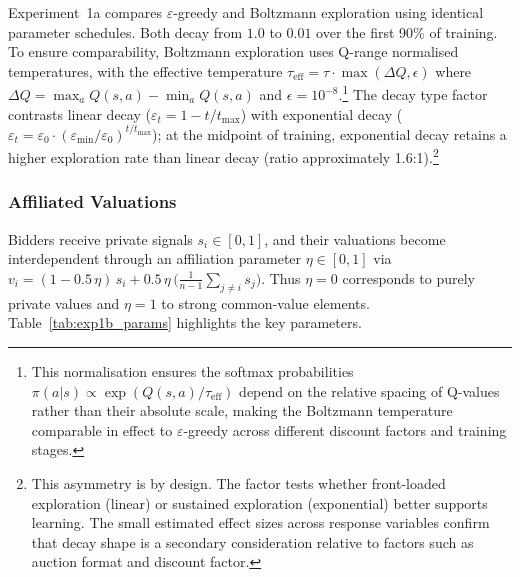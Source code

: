 Experiment~1a compares $\varepsilon$-greedy and Boltzmann exploration using identical parameter schedules. Both decay from $1.0$ to $0.01$ over the first 90\% of training. To ensure comparability, Boltzmann exploration uses Q-range normalised temperatures, with the effective temperature $\tau_{\text{eff}} = \tau \cdot \max(\Delta Q, \epsilon)$ where $\Delta Q = \max_a Q(s,a) - \min_a Q(s,a)$ and $\epsilon = 10^{-8}$.\footnote{This normalisation ensures the softmax probabilities $\pi(a|s) \propto \exp(Q(s,a)/\tau_{\text{eff}})$ depend on the relative spacing of Q-values rather than their absolute scale, making the Boltzmann temperature comparable in effect to $\varepsilon$-greedy across different discount factors and training stages.} The decay type factor contrasts linear decay ($\varepsilon_t = 1 - t/t_{\max}$) with exponential decay ($\varepsilon_t = \varepsilon_0 \cdot (\varepsilon_{\min}/\varepsilon_0)^{t/t_{\max}}$); at the midpoint of training, exponential decay retains a higher exploration rate than linear decay (ratio approximately 1.6:1).\footnote{This asymmetry is by design. The factor tests whether front-loaded exploration (linear) or sustained exploration (exponential) better supports learning. The small estimated effect sizes across response variables confirm that decay shape is a secondary consideration relative to factors such as auction format and discount factor.}

\subsubsection{Affiliated Valuations}

Bidders receive private signals $s_i\in[0,1]$, and their valuations become interdependent through an affiliation parameter $\eta\in[0,1]$ via $v_i=(1-0.5\,\eta)\,s_i + 0.5\,\eta\,\bigl(\tfrac{1}{n-1}\sum_{j\neq i}s_j\bigr)$. Thus $\eta=0$ corresponds to purely private values and $\eta=1$ to strong common-value elements. Table~\ref{tab:exp1b_params} highlights the key parameters.

